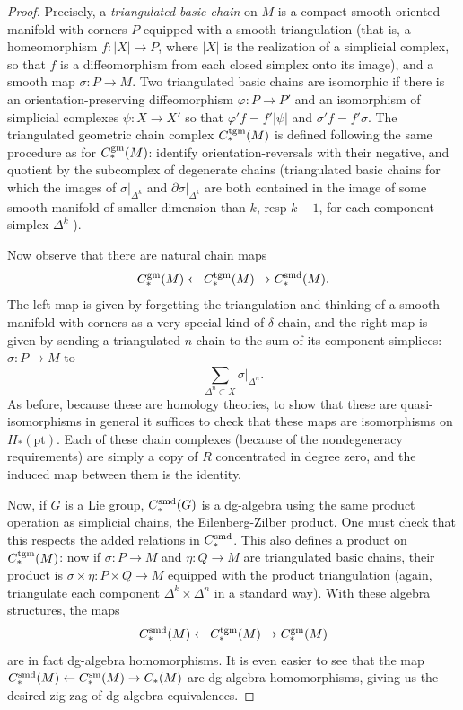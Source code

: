 \documentclass{memo-l}
\theoremstyle{definition}
\theoremstyle{remark}
\numberwithin{section}{chapter}
\numberwithin{equation}{chapter}
\begin{document}
\begin{proof}
Precisely, a \emph{triangulated basic chain} on $M$ is a compact smooth oriented manifold with corners $P$ equipped with a smooth triangulation (that is, a homeomorphism $f: |X| \to P$, where $|X|$ is the realization of a simplicial complex, so that $f$ is a diffeomorphism from each closed simplex onto its image), and a smooth map $\sigma: P \to M$. Two triangulated basic chains are isomorphic if there is an orientation-preserving diffeomorphism $\varphi: P \to P'$ and an isomorphism of simplicial complexes $\psi: X \to X'$ so that $\varphi' f = f' |\psi|$ and $\sigma' f = f' \sigma$. The triangulated geometric chain complex $C_*^\textup{tgm}(M)$ is defined following the same procedure as for $C_*^{\textup{gm}}(M)$: identify orientation-reversals with their negative, and quotient by the subcomplex of degenerate chains (triangulated basic chains for which the images of $\sigma|_{\Delta^k}$ and $\partial \sigma|_{\Delta^k}$ are both contained in the image of some smooth manifold of smaller dimension than $k$, resp $k-1$, for each component simplex $\Delta^k$ ).

Now observe that there are natural chain maps $$C_*^{\textup{gm}}(M) \leftarrow C_*^\textup{tgm}(M) \to C_*^\textup{smd}(M).$$ The left map is given by forgetting the triangulation and thinking of a smooth manifold with corners as a very special kind of $\delta$-chain, and the right map is given by sending a triangulated $n$-chain to the sum of its component simplices: $\sigma: P \to M$ to $$\sum_{\Delta^n \subset X} \sigma\big|_{\Delta^n}.$$ As before, because these are homology theories, to show that these are quasi-isomorphisms in general it suffices to check that these maps are isomorphisms on $H_*(\text{pt})$. Each of these chain complexes (because of the nondegeneracy requirements) are simply a copy of $R$ concentrated in degree zero, and the induced map between them is the identity.

Now, if $G$ is a Lie group, $C_*^\textup{smd}(G)$ is a dg-algebra using the same product operation as simplicial chains, the Eilenberg-Zilber product. One must check that this respects the added relations in $C_*^{\textup{smd}}$. This also defines a product on $C_*^\textup{tgm}(M)$: now if $\sigma: P \to M$ and $\eta: Q \to M$ are triangulated basic chains, their product is $\sigma \times \eta: P \times Q \to M$ equipped with the product triangulation (again, triangulate each component $\Delta^k \times \Delta^n$ in a standard way). With these algebra structures, the maps $$C_*^\textup{smd}(M) \leftarrow C_*^\textup{tgm}(M) \to C_*^{\textup{gm}}(M)$$ are in fact dg-algebra homomorphisms. It is even easier to see that the map $C_*^\textup{smd}(M) \leftarrow C_*^\textup{sm}(M) \to C_*(M)$ are dg-algebra homomorphisms, giving us the desired zig-zag of dg-algebra equivalences.
\end{proof}
\end{document}
